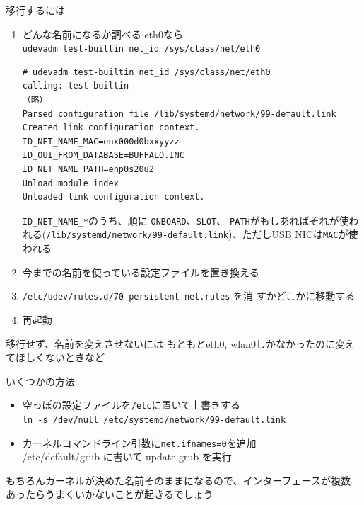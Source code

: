 \begin{frame}[containsverbatim]{移行するには}

 \begin{enumerate}%
  \item どんな名前になるか調べる eth0なら\\
	{\small{\texttt{udevadm test-builtin net\_id /sys/class/net/eth0}}}
       {\scriptsize
       \begin{verbatim}
# udevadm test-builtin net_id /sys/class/net/eth0
calling: test-builtin
（略）
Parsed configuration file /lib/systemd/network/99-default.link
Created link configuration context.
ID_NET_NAME_MAC=enx000d0bxxyyzz
ID_OUI_FROM_DATABASE=BUFFALO.INC
ID_NET_NAME_PATH=enp0s20u2
Unload module index
Unloaded link configuration context.
\end{verbatim}}
	{\footnotesize\texttt{ID\_NET\_NAME\_*}}のうち、順に
	{\footnotesize\texttt{ONBOARD}}、{\footnotesize\texttt{SLOT}}、
	{\footnotesize\texttt{PATH}}がもしあればそれが使われる({\footnotesize\texttt{/lib/systemd/network/99-default.link}})、ただしUSB NICは{\footnotesize\texttt{MAC}}が使われる
  \item 今までの名前を使っている設定ファイルを置き換える
  \item \small{\texttt{/etc/udev/rules.d/70-persistent-net.rules}} を消
	すかどこかに移動する
  \item 再起動
 \end{enumerate}
\end{frame}

\begin{frame}[containsverbatim]{移行せず、名前を変えさせないには}
 もともとeth0, wlan0しかなかったのに変えてほしくないときなど

 いくつかの方法
\begin{itemize}
 \item 空っぽの設定ファイルを\texttt{/etc}に置いて上書きする\\
       {\small{\verb|ln -s /dev/null /etc/systemd/network/99-default.link|}}
 \item カーネルコマンドライン引数に\texttt{net.ifnames=0}を追加\\
       /etc/default/grub に書いて update-grub を実行
\end{itemize}

 もちろんカーネルが決めた名前そのままになるので、インターフェースが複数
 あったらうまくいかないことが起きるでしょう
\end{frame}

